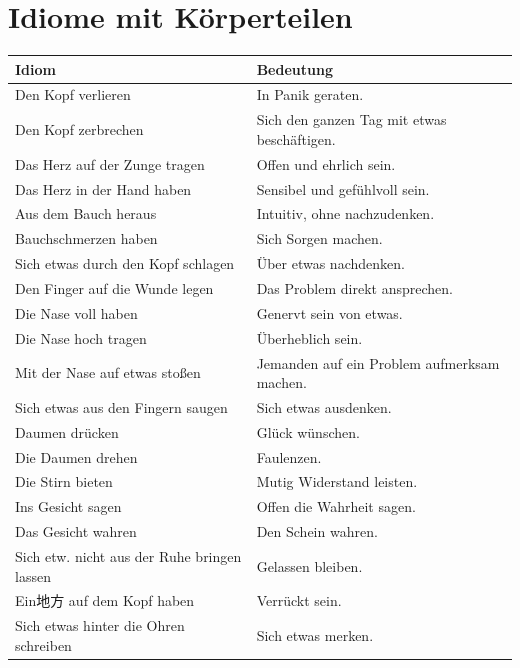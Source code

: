 \section{Idiome mit Körperteilen}
\label{sec Koerper}

\bigskip
\begin{center}
\begin{tabular}{|l|p{8cm}|}
\hline
Idiom & Bedeutung \\ \hline
Den Kopf verlieren & In Panik geraten. \\ \hline
Den Kopf zerbrechen & Sich den ganzen Tag mit etwas beschäftigen. \\ \hline
Das Herz auf der Zunge tragen & Offen und ehrlich sein. \\ \hline
Das Herz in der Hand haben & Sensibel und gefühlvoll sein. \\ \hline
Aus dem Bauch heraus & Intuitiv, ohne nachzudenken. \\ \hline
Bauchschmerzen haben & Sich Sorgen machen. \\ \hline
Sich etwas durch den Kopf schlagen & Über etwas nachdenken. \\ \hline
Den Finger auf die Wunde legen & Das Problem direkt ansprechen. \\ \hline
Die Nase voll haben & Genervt sein von etwas. \\ \hline
Die Nase hoch tragen & Überheblich sein. \\ \hline
Mit der Nase auf etwas stoßen & Jemanden auf ein Problem aufmerksam machen. \\ \hline
Sich etwas aus den Fingern saugen & Sich etwas ausdenken. \\ \hline
Daumen drücken & Glück wünschen. \\ \hline
Die Daumen drehen & Faulenzen. \\ \hline
Die Stirn bieten & Mutig Widerstand leisten. \\ \hline
Ins Gesicht sagen & Offen die Wahrheit sagen. \\ \hline
Das Gesicht wahren & Den Schein wahren. \\ \hline
Sich etw. nicht aus der Ruhe bringen lassen & Gelassen bleiben. \\ \hline
Ein地方 auf dem Kopf haben & Verrückt sein. \\ \hline
Sich etwas hinter die Ohren schreiben & Sich etwas merken. \\ \hline
\end{tabular}
\end{center}

